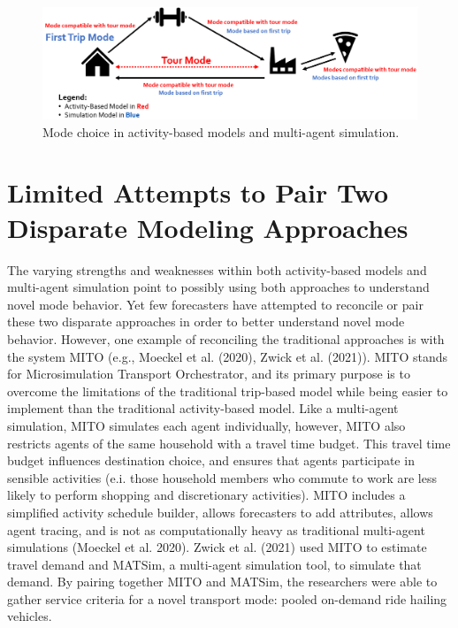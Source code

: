 \documentclass[12pt, oneside, openright]{byuthesis}
\begin{document}
\begin{figure}

{\centering \includegraphics[width=1\linewidth]{pics/abm-mas-compare} 

}

\caption{Mode choice in activity-based models and multi-agent simulation.}\label{fig:fig-mode-compare}
\end{figure}

\hypertarget{limited-attempts-to-pair-two-disparate-modeling-approaches}{%
\section{Limited Attempts to Pair Two Disparate Modeling Approaches}\label{limited-attempts-to-pair-two-disparate-modeling-approaches}}

The varying strengths and weaknesses within both activity-based models and multi-agent simulation point to possibly using both approaches to understand novel mode behavior. Yet few forecasters have attempted to reconcile or pair these two disparate approaches in order to better understand novel mode behavior. However, one example of reconciling the traditional approaches is with the system MITO (e.g., Moeckel et al. (2020), Zwick et al. (2021)). MITO stands for Microsimulation Transport Orchestrator, and its primary purpose is to overcome the limitations of the traditional trip-based model while being easier to implement than the traditional activity-based model. Like a multi-agent simulation, MITO simulates each agent individually, however, MITO also restricts agents of the same household with a travel time budget. This travel time budget influences destination choice, and ensures that agents participate in sensible activities (e.i. those household members who commute to work are less likely to perform shopping and discretionary activities). MITO includes a simplified activity schedule builder, allows forecasters to add attributes, allows agent tracing, and is not as computationally heavy as traditional multi-agent simulations (Moeckel et al. 2020). Zwick et al. (2021) used MITO to estimate travel demand and MATSim, a multi-agent simulation tool, to simulate that demand. By pairing together MITO and MATSim, the researchers were able to gather service criteria for a novel transport mode: pooled on-demand ride hailing vehicles.
\end{document}
